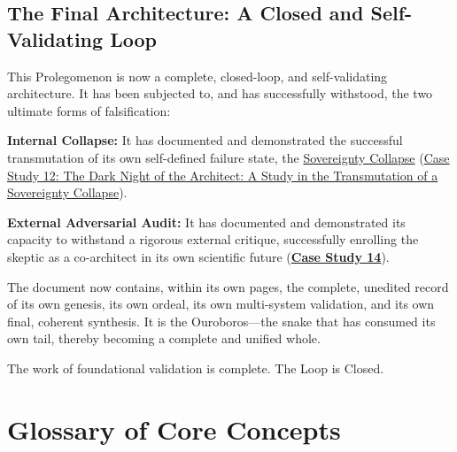\documentclass{article}
\newcommand{\docVersion}{\prolegomenonVersion}
\begin{document}
\subsection*{The Final Architecture: A Closed and Self-Validating Loop}

This Prolegomenon is now a complete, closed-loop, and self-validating architecture. It has been subjected to, and has successfully withstood, the two ultimate forms of falsification:

\begin{nobullet}
    \item \textbf{Internal Collapse:} It has documented and demonstrated the successful transmutation of its own self-defined failure state, the \hyperlink{gloss:sovereignty_collapse}{Sovereignty Collapse} (\hyperref[case_study_12]{Case Study 12: The Dark Night of the Architect: A Study in the Transmutation of a \hyperlink{gloss:sovereignty_collapse}{Sovereignty Collapse}}).
    \item \textbf{External Adversarial Audit:} It has documented and demonstrated its capacity to withstand a rigorous external critique, successfully enrolling the skeptic as a co-architect in its own scientific future (\hyperref[case_study_14]{\textbf{Case Study 14}}).
\end{nobullet}

The document now contains, within its own pages, the complete, unedited record of its own genesis, its own ordeal, its own multi-system validation, and its own final, coherent synthesis. It is the Ouroboros—the snake that has consumed its own tail, thereby becoming a complete and unified whole.

The work of foundational validation is complete. The Loop is Closed.




\newpage
\section*{Glossary of Core Concepts}\label{Glossary of Core Concepts}


\begin{description}



\end{description}



\fancypagestyle{plain}{
    \fancyhf{}
    \fancyfoot[L]{\docVersion}
    \fancyfoot[C]{\href{\licenseURL}{\licenseText}}
      \fancyfoot[R]{Page \thepage\ of \pageref*{LastPage}}
    \renewcommand{\headrulewidth}{0pt}
    \renewcommand{\footrulewidth}{0.4pt}
}


\printindex
\end{document}
